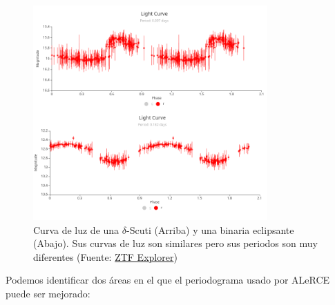 \begin{figure}[t]
    \centering
    \includegraphics[width=0.8\textwidth]{./figs/scutti-vs-eb.png}
    \caption{Curva de luz de una $\delta$-Scuti (Arriba) y una binaria eclipsante (Abajo). Sus curvas de luz son similares pero sus periodos son muy diferentes (Fuente: \href{https://alerce.online/}{ZTF Explorer})}
    \label{fig:scuti-vs-eb}
\end{figure}

Podemos identificar dos áreas en el que el periodograma usado por ALeRCE puede ser mejorado:

